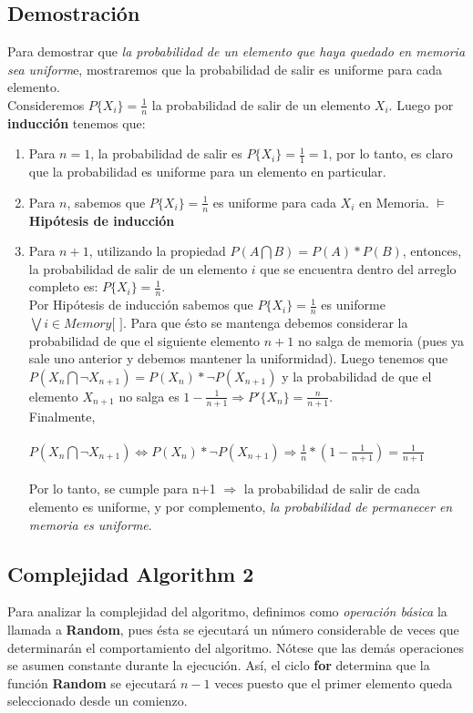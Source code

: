 \documentclass[11pt]{article}
\begin{document}
\subsection{Demostración}
Para demostrar que \emph{la probabilidad de un elemento que haya quedado en memoria sea uniform}e, mostraremos que la probabilidad de salir es uniforme para cada elemento.\\ Consideremos $P\{X_i\}=\frac{1}{n}$ la probabilidad de salir de un elemento $X_i$. Luego por \textbf{inducción} tenemos que:
\begin{enumerate}
\item Para $n = 1$, la probabilidad de salir es $P\{X_i\}=\frac{1}{1} = 1$, por lo tanto, es claro que la probabilidad es uniforme para un elemento en particular.

\item Para $n$, sabemos que $P\{X_i\}=\frac{1}{n}$ es uniforme para cada $X_i$ en Memoria. $\models$ \textbf{Hipótesis de inducción}

\item Para $n+1$, utilizando la propiedad $P(A\bigcap B) = P(A)\ast P(B)$, entonces, la probabilidad de salir de un elemento $i$ que se encuentra dentro del arreglo completo es: $P\{X_i\}=\frac{1}{n}$.\\Por Hipótesis de inducción sabemos que $P\{X_i\}=\frac{1}{n}$ es uniforme $\bigvee i \in Memory$$[$ $]$. Para que ésto se mantenga debemos considerar la probabilidad de que el siguiente elemento $n+1$ no salga de memoria (pues ya sale uno anterior y debemos mantener la uniformidad). Luego tenemos que $P(X_n\bigcap \neg X_{n+1}) = P(X_n)\ast \neg P(X_{n+1})$ y la probabilidad de que el elemento $X_{n+1}$ no salga es $1-\frac{1}{n+1} \Rightarrow P'\{X_n\}=\frac{n}{n+1}$.\\ Finalmente,\\\\ $P(X_n\bigcap \neg X_{n+1}) \Leftrightarrow P(X_n)\ast \neg P(X_{n+1}) \Rightarrow \frac{1}{n} \ast (1-\frac{1}{n+1}) = \frac{1}{n+1}$\\\\Por lo tanto, se cumple para n+1 $\Rightarrow$ la probabilidad de salir de cada elemento es uniforme, y por complemento, \emph{la probabilidad de permanecer en memoria es uniforme}.
\end{enumerate}

\subsection{Complejidad Algorithm 2}
Para analizar la complejidad del algoritmo, definimos como \emph{operación básica} la llamada a \textbf{Random}, pues ésta se ejecutará un número considerable de veces que determinarán el comportamiento del algoritmo.
Nótese que las demás operaciones se asumen constante durante la ejecución. Así, el ciclo \textbf{for} determina que la función \textbf{Random} se ejecutará $n-1$ veces puesto que el primer elemento queda seleccionado desde un comienzo.\\
\end{document}
